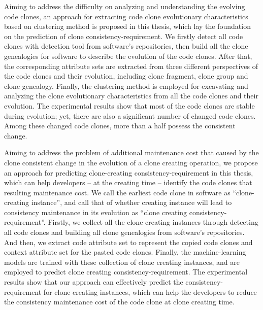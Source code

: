 {Aiming to address the difficulty on analyzing and understanding the evolving code clones, an approach for extracting code clone evolutionary characteristics based on clustering method is proposed in this thesis, which lay the foundation on the prediction of clone consistency-requirement.
We firstly detect all code clones with detection tool from software's repositories, then build all the clone genealogies for software to describe the evolution of the code clones.
After that, the corresponding attribute sets are extracted from three different perspectives of the code clones and their evolution, including clone fragment, clone group and clone genealogy. 
Finally, the clustering method is employed for excavating and analyzing the clone evolutionary characteristics from all the code clones and their evolution. 
The experimental results show that most of the code clones are stable during evolution; yet, there are also a significant number of changed code clones.
Among these changed code clones, more than a half possess the consistent change.

Aiming to address the problem of additional maintenance cost that caused by the clone consistent change in the evolution of a clone creating operation, we propose an approach for predicting clone-creating consistency-requirement in this thesis, which can help developers -- at the creating time -- identify the code clones that resulting maintenance cost.
We call the earliest code clone in software as ``clone-creating instance'', and call that of whether creating instance will lead to consistency maintenance in its evolution as ``clone creating consistency-requirement''.
Firstly, we collect all the clone creating instances through detecting all code clones and building all clone genealogies from software's repositories.
And then, we extract code attribute set to represent the copied code clones and context attribute set for the pasted code clones.
Finally, the machine-learning models are trained with these collection of clone creating instances, and are employed to predict clone creating consistency-requirement. 
The experimental results show that our approach can effectively predict the consistency-requirement for clone creating instances, which can help the developers to reduce the consistency maintenance cost of the code clone at clone creating time.

}
